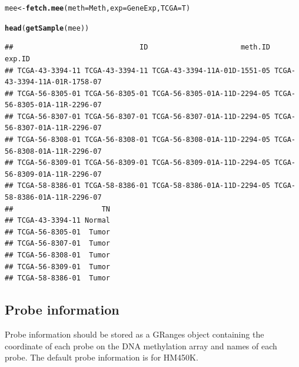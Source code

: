 \documentclass{article}\usepackage[]{graphicx}\usepackage[]{color}
\makeatletter
\newcommand{\hlstd}[1]{\textcolor[rgb]{0.345,0.345,0.345}{#1}}%
\newcommand{\hlkwb}[1]{\textcolor[rgb]{0.69,0.353,0.396}{#1}}%
\newcommand{\hlkwc}[1]{\textcolor[rgb]{0.333,0.667,0.333}{#1}}%
\newcommand{\hlkwd}[1]{\textcolor[rgb]{0.737,0.353,0.396}{\textbf{#1}}}%
\newenvironment{kframe}{%
 \def\at@end@of@kframe{}%
 \ifinner\ifhmode%
  \def\at@end@of@kframe{\end{minipage}}%
  \begin{minipage}{\columnwidth}%
 \fi\fi%
 \def\FrameCommand##1{\hskip\@totalleftmargin \hskip-\fboxsep
 \colorbox{shadecolor}{##1}\hskip-\fboxsep
     \hskip-\linewidth \hskip-\@totalleftmargin \hskip\columnwidth}%
 \MakeFramed {\advance\hsize-\width
   \@totalleftmargin\z@ \linewidth\hsize
   \@setminipage}}%
 {\par\unskip\endMakeFramed%
 \at@end@of@kframe}
\newenvironment{knitrout}{}{} %
\makeatother
\begin{document}
\begin{knitrout}
\color{fgcolor}\begin{kframe}
\begin{alltt}
\hlstd{mee} \hlkwb{<-} \hlkwd{fetch.mee}\hlstd{(}\hlkwc{meth}\hlstd{=Meth,} \hlkwc{exp}\hlstd{=GeneExp,} \hlkwc{TCGA}\hlstd{=T)}
\end{alltt}


{\ttfamily\noindent\itshape{}}\begin{alltt}
\hlkwd{head}\hlstd{(}\hlkwd{getSample}\hlstd{(mee))}
\end{alltt}
\begin{verbatim}
##                              ID                      meth.ID                       exp.ID
## TCGA-43-3394-11 TCGA-43-3394-11 TCGA-43-3394-11A-01D-1551-05 TCGA-43-3394-11A-01R-1758-07
## TCGA-56-8305-01 TCGA-56-8305-01 TCGA-56-8305-01A-11D-2294-05 TCGA-56-8305-01A-11R-2296-07
## TCGA-56-8307-01 TCGA-56-8307-01 TCGA-56-8307-01A-11D-2294-05 TCGA-56-8307-01A-11R-2296-07
## TCGA-56-8308-01 TCGA-56-8308-01 TCGA-56-8308-01A-11D-2294-05 TCGA-56-8308-01A-11R-2296-07
## TCGA-56-8309-01 TCGA-56-8309-01 TCGA-56-8309-01A-11D-2294-05 TCGA-56-8309-01A-11R-2296-07
## TCGA-58-8386-01 TCGA-58-8386-01 TCGA-58-8386-01A-11D-2294-05 TCGA-58-8386-01A-11R-2296-07
##                     TN
## TCGA-43-3394-11 Normal
## TCGA-56-8305-01  Tumor
## TCGA-56-8307-01  Tumor
## TCGA-56-8308-01  Tumor
## TCGA-56-8309-01  Tumor
## TCGA-58-8386-01  Tumor
\end{verbatim}
\end{kframe}
\end{knitrout}

\subsection{Probe information}
Probe information should be stored as a GRanges object containing the coordinate 
of each probe on the DNA methylation array and names of each probe. 
The default probe information is for HM450K. 
\end{document}
